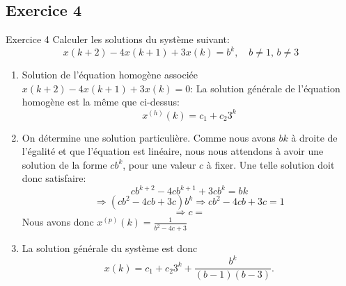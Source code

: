          \subsection{Exercice 4}
            \begin{exercise}{Exercice 4}
                Calculer les solutions du système suivant:
                \begin{equation}
                    x(k+2)-4x(k+1)+3x(k) = b^k, \quad b \neq 1, \, b \neq 3
                \end{equation}
            \end{exercise}
            \begin{enumerate}
                \item Solution de l’équation homogène associée $x(k+2)-4x(k+1)+3x(k) = 0$:
                La solution générale de l’équation homogène est la même que ci-dessus:
                \begin{equation}
                x^{(h)}(k) = c_1+c_2 3^k
                \end{equation}
                \item On détermine une solution particulière. Comme nous avons $bk$ à droite de l’égalité et que l’équation est linéaire, nous nous attendons à avoir une solution de la forme $c b^k$, pour une valeur $c$ à fixer. Une telle solution doit donc satisfaire:
                \begin{equation}
                    cb^{k+2}-4cb^{k+1}+3cb^{k} = bk
                \end{equation}
                \begin{equation}
                    \Rightarrow (cb^2-4cb+3c)b^k \Rightarrow cb^2-4cb+3c = 1
                \end{equation}
                \begin{equation}
                    \Rightarrow c =
                \end{equation}
                Nous avons donc $x^{(p)}(k) = \frac 1{b^2-4c+3}$
                \item La solution générale du système est donc
                \begin{equation}
                    x(k) = c_1+c_2 3^k + \frac {b^k}{(b-1)(b-3)}.
                \end{equation}
            \end{enumerate}
